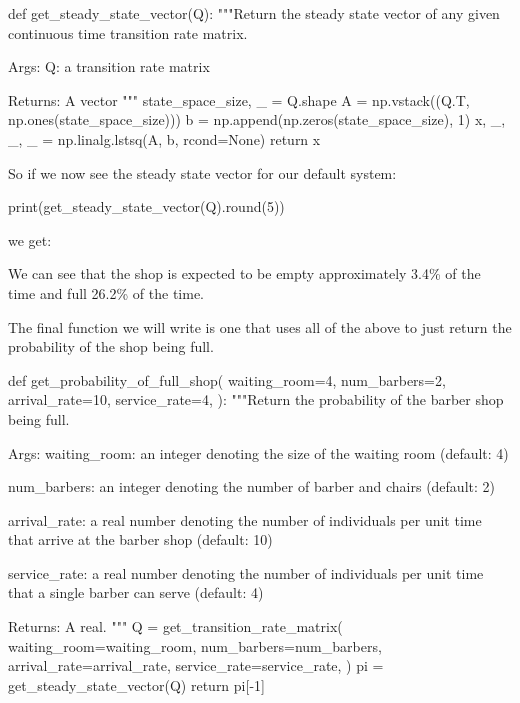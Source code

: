 \begin{pyin}
def get_steady_state_vector(Q):
    """Return the steady state vector of any given continuous
    time transition rate matrix.

    Args:
       Q: a transition rate matrix

    Returns:
        A vector
    """
    state_space_size, _ = Q.shape
    A = np.vstack((Q.T, np.ones(state_space_size)))
    b = np.append(np.zeros(state_space_size), 1)
    x, _, _, _ = np.linalg.lstsq(A, b, rcond=None)
    return x
\end{pyin}

So if we now see the steady state vector for our default system:

\begin{pyin}
print(get_steady_state_vector(Q).round(5))
\end{pyin}

we get:

\begin{pyout}
[0.03431 0.08577 0.10722 0.13402 0.16752 0.2094  0.26176]
\end{pyout}

We can see that the shop is expected to be empty approximately 3.4\% of the time
and full 26.2\% of the time.

The final function we will write is one that uses all of
the above to just return the probability of the shop being full.

\begin{pyin}
def get_probability_of_full_shop(
    waiting_room=4,
    num_barbers=2,
    arrival_rate=10,
    service_rate=4,
):
    """Return the probability of the barber shop being full.

    Args:
        waiting_room: an integer denoting the size of
                      the waiting room (default: 4)

        num_barbers: an integer denoting the number
                     of barber and chairs
                     (default: 2)

        arrival_rate: a real number denoting the number of
                      individuals per unit time that arrive
                      at the barber shop (default: 10)

        service_rate: a real number denoting the number of
                      individuals per unit time that a single
                      barber can serve (default: 4)

    Returns:
        A real.
    """
    Q = get_transition_rate_matrix(
        waiting_room=waiting_room,
        num_barbers=num_barbers,
        arrival_rate=arrival_rate,
        service_rate=service_rate,
    )
    pi = get_steady_state_vector(Q)
    return pi[-1]
\end{pyin}

